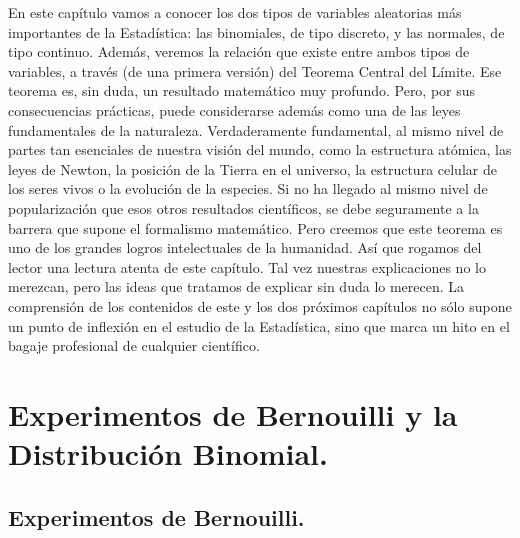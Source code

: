 
En este capítulo vamos a conocer los dos tipos de variables aleatorias más importantes de la Estadística: las binomiales, de tipo discreto, y las normales, de tipo continuo. Además, veremos la relación que existe entre ambos tipos de variables, a través (de una primera versión) del  Teorema Central del Límite. Ese teorema es, sin duda, un resultado matemático muy profundo. Pero, por sus consecuencias prácticas, puede considerarse además como una de las leyes fundamentales de la naturaleza. Verdaderamente fundamental, al mismo nivel de partes tan esenciales de nuestra visión del mundo, como la estructura atómica, las leyes de Newton, la posición de la Tierra en el universo, la estructura celular de los seres vivos o la evolución de la especies.  Si no ha llegado al mismo nivel de popularización que esos otros resultados científicos, se debe seguramente a la barrera que supone el formalismo matemático. Pero creemos que este teorema es uno de los grandes logros intelectuales de la humanidad. Así que rogamos del lector una lectura atenta de este capítulo. Tal vez nuestras explicaciones no lo merezcan, pero las ideas que tratamos de explicar sin duda lo merecen. La comprensión de los contenidos de este y los dos próximos capítulos no sólo supone un punto de inflexión en el estudio de la Estadística, sino que marca un hito en el bagaje profesional de cualquier científico.


\section{Experimentos de Bernouilli y la Distribución Binomial.}
\label{cap05:sec:ExperimentosBernouilliDistribucionBinomial}


\subsection{Experimentos de Bernouilli.}
\label{cap05:subsec:ExperimentosBernouilli}

